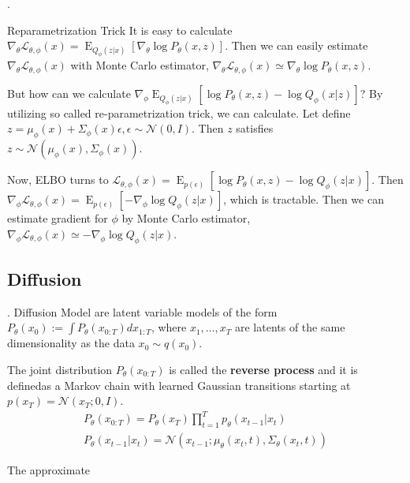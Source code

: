 \documentclass[8pt]{beamer}
\newcommand{\mc}[1]{\mathcal{#1}}
\newcommand{\tb}[1]{\textbf{#1}}
\newcommand{\expe}{\operatorname{E}}
\begin{document}
\begin{frame}{.}
    \begin{block}{Reparametrization Trick}
        It is easy to calculate $\nabla_\theta \mc{L}_{\theta, \phi}(x) = \expe_{Q_\phi (z|x)}[\nabla_\theta \log{P_\theta (x,z)}]$. Then we can easily estimate $\nabla_\theta \mc{L}_{\theta, \phi}(x)$ with Monte Carlo estimator, $\nabla_\theta \mc{L}_{\theta, \phi}(x) \simeq \nabla_\theta \log P_\theta(x,z)$.

        \bigskip
        But how can we calculate $\nabla_\phi \expe_{Q_\phi (z|x)}[\log P_\theta (x,z) - \log Q_\phi (x|z)]$?
        By utilizing so called re-parametrization trick, we can calculate.
        Let define $z = \mu_\phi(x) + \Sigma_\phi (x) \epsilon, \epsilon \sim \mc{N}(0,I)$. Then $z$ satisfies $z \sim \mc{N}(\mu_\phi(x), \Sigma_\phi(x))$.

        \bigskip

        Now, ELBO turns to $\mc{L}_{\theta, \phi} (x) = \expe_{p(\epsilon)}[\log P_\theta(x,z) - \log Q_\phi(z|x)]$. Then $\nabla_\phi \mc{L}_{\theta, \phi} (x) = \expe_{p(\epsilon)}[- \nabla_\phi \log Q_\phi (z|x)]$, which is tractable. Then we can estimate gradient for $\phi$ by Monte Carlo estimator, $\nabla_\phi \mc{L}_{\theta, \phi} (x) \simeq  - \nabla_\phi \log Q_\phi (z|x)$.
    \end{block}

\end{frame}

\subsection{Diffusion}

\begin{frame}{.}
    Diffusion Model are latent variable models of the form $P_\theta(x_0) := \int P_\theta (x_{0:T})dx_{1:T}$, where $x_1, \dots, x_T$ are latents of the same dimensionality as the data $x_0 \sim q(x_0)$.

    The joint distribution $P_\theta(x_{0:T})$ is called the \tb{reverse process} and it is definedas a Markov chain with learned Gaussian transitions starting at $p(x_T) = \mc{N}(x_T; 0, I)$.
    \[
    \begin{gathered}
        P_\theta(x_{0:T}) = P_\theta(x_T) \prod_{t=1}^T p_\theta(x_{t-1}|x_{t}) \\
        P_\theta(x_{t-1}|x_{t}) = \mc{N}(x_{t-1}; \mu_\theta(x_t, t), \Sigma_\theta (x_t, t))
    \end{gathered}
    \]

    The approximate

\end{frame}
\end{document}
